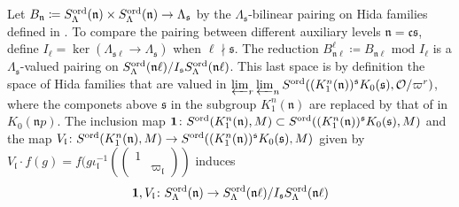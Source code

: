 \documentclass[leqno]{amsart}
\newcommand{\smat}[1]{\left( \begin{smallmatrix} #1 \end{smallmatrix} \right)}
\newcommand{\ord}{\textnormal{ord}}
\newcommand{\id}{\mathbf{1}}
\newcommand{\oo}{\mathcal{O}} %
\newcommand{\fc}{\mathfrak{c}}
\newcommand{\fs}{\mathfrak{s}}
\newcommand{\fn}{\mathfrak{n}}
\newcommand{\fl}{\mathfrak{l}}
\theoremstyle{definition}
\theoremstyle{remark}
\begin{document}
Let $B_\fn\coloneqq S_\Lambda^{\ord}(\fn)\times
S_\Lambda^{\ord}(\fn)\to \Lambda_{\fs}$ 
by the $\Lambda_{\fs}$-bilinear pairing
on Hida families defined in \cite[\S 6.4.1]{lee}.
To compare the pairing between different
auxiliary levels $\fn=\fc\fs$,
define $I_{\ell}=\ker(\Lambda_{\fs\ell}\to \Lambda_{\fs})$
when $\ell\nmid \fs$.
The reduction 
$B_{\fn\ell}^{\ell}\coloneqq B_{\fn\ell}\text{ mod }I_\ell$
is a $\Lambda_{\fs}$-valued pairing on 
$S_\Lambda^{\ord}(\fn\ell)/I_\fs S_\Lambda^{\ord}(\fn\ell)$.
This last space is by definition
the space of Hida families that are valued 
in $\varprojlim_r\varprojlim_n 
S^{\ord}((K^n_1(\fn))^{\fs}K_0(\fs),\oo/\varpi^r)$,
where the componets above $\fs$ in the subgroup $K^n_1(\fn)$
are replaced by that of in $K_0(\fn p)$.
The inclusion map 
$\id\colon S^{\ord}(K^n_1(\fn),M)\subset
S^{\ord}((K^n_1(\fn))^{\fs}K_0(\fs),M)$
and the map
$V_{\fl}\colon S^{\ord}(K^n_1(\fn),M)\to
S^{\ord}((K^n_1(\fn))^{\fs}K_0(\fs),M)$
given by $V_\fl\cdot f(g)=
f(g\iota_\fl^{-1}(\smat{1&\\&\varpi_\fl})$ induces
\[
\id, V_\fl\colon S^{\ord}_{\Lambda}(\fn)\to
S_\Lambda^{\ord}(\fn\ell)/I_\fs S_\Lambda^{\ord}(\fn\ell)
\]
\end{document}
